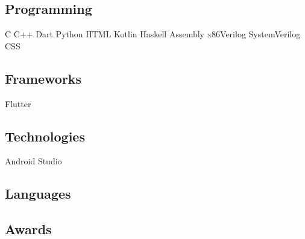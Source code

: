 \documentclass[]{deedy-resume-openfont}
\begin{document}
\begin{minipage}[t]{0.33\textwidth}

\subsection{Programming}
 C \textbullet{} C++ \textbullet{} Dart\textbullet{} Python \textbullet{} HTML\newline
{}
\vspace{1mm}
Kotlin \textbullet{} Haskell \textbullet{} Assembly x86\newline Verilog
\textbullet{} SystemVerilog \textbullet{} CSS
\vspace{3mm} %


\subsection{Frameworks}
Flutter 
\vspace{3mm}

\subsection{Technologies}
Android Studio 
\vspace{3mm}


\subsection{Languages}
\vspace{3mm}

\subsection{Awards}
\textbullet {}
\textbullet {}


\end{minipage}
\end{document}
